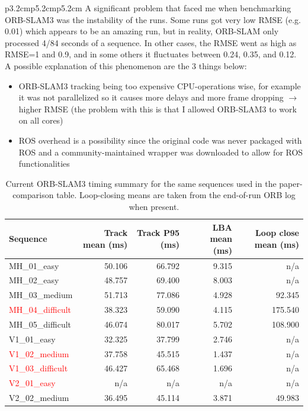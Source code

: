 \documentclass[11pt]{article}
\begin{document}
\begin{table}[ht]
\begin{tabular}{p{3.2cm}p{5.2cm}p{5.2cm}}
A significant problem that faced me when benchmarking ORB-SLAM3 was the instability of the runs. Some runs got very low RMSE (e.g. 0.01) which appears to be an amazing run, but in reality, ORB-SLAM only processed 4/84 seconds of a sequence. In other cases, the RMSE went as high as RMSE=1 and 0.9, and in some others it fluctuates between 0.24, 0.35, and 0.12. A possible explanation of this phenomenon are the 3 things below:
\begin{itemize}
    \item ORB-SLAM3 tracking being too expensive CPU-operations wise, for example it was not parallelized so it causes more delays and more frame dropping $\to$ higher RMSE (the problem with this is that I allowed ORB-SLAM3 to work on all cores) 
    \item ROS overhead is a possibility since the original code was never packaged with ROS and a community-maintained wrapper was downloaded to allow for ROS functionalities
\end{itemize}

\begin{table}[H]
\centering
\small
\caption{Current ORB-SLAM3 timing summary for the same sequences used in the paper-comparison table. Loop-closing means are taken from the end-of-run ORB log when present.}
\label{tab:orb_vs_paper_timing}
\begin{tabular}{lrrrr}
\toprule
Sequence & Track mean (ms) & Track P95 (ms) & LBA mean (ms) & Loop close mean (ms) \\
\midrule
MH\_01\_easy & 50.106 & 66.792 & 9.315 & n/a \\
MH\_02\_easy & 48.757 & 69.400 & 8.003 & n/a \\
MH\_03\_medium & 51.713 & 77.086 & 4.928 & 92.345 \\
\textcolor{red}{MH\_04\_difficult} & 38.323 & 59.090 & 4.115 & 175.540 \\
MH\_05\_difficult & 46.074 & 80.017 & 5.702 & 108.900 \\
V1\_01\_easy & 32.325 & 37.799 & 2.746 & n/a \\
\textcolor{red}{V1\_02\_medium} & 37.758 & 45.515 & 1.437 & n/a \\
\textcolor{red}{V1\_03\_difficult} & 46.427 & 65.468 & 1.696 & n/a \\
\textcolor{red}{V2\_01\_easy} & n/a & n/a & n/a & n/a \\
V2\_02\_medium & 36.495 & 45.114 & 3.871 & 49.983 \\
\bottomrule
\end{tabular}
\end{table}


\end{tabular}
\end{table}
\end{document}
